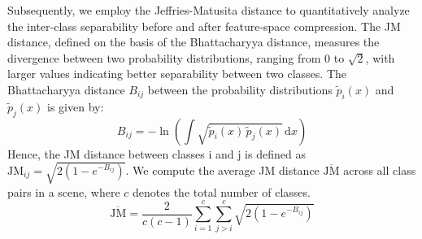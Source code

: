 \documentclass[runningheads]{llncs}
\begin{document}
Subsequently, we employ the Jeffries-Matusita distance to quantitatively analyze the inter‑class separability before and after feature‑space compression. The JM distance, defined on the basis of the Bhattacharyya distance, measures the divergence between two probability distributions, ranging from 0 to $\sqrt{2}$, with larger values indicating better separability between two classes. The Bhattacharyya distance $B_{ij}$ between the probability distributions $\tilde{p}_i(x)$ and $\tilde{p}_j(x)$ is given by:
\begin{equation}
    B_{ij} = -\ln \left( \int \sqrt{\tilde{p}_i(x) \, \tilde{p}_j(x)} \, \mathrm{d}x \right)
\end{equation}
Hence, the JM distance between classes i and j is defined as $\text{JM}_{ij} = \sqrt{2(1 - e^{-B_{ij}})}$. We compute the average JM distance $\overline{\text{JM}}$ across all class pairs in a scene, where $c$ denotes the total number of classes.
\begin{equation}
    \overline{\text{JM}} = \frac{2}{c(c-1)} \sum_{i=1}^{c} \sum_{j>i}^{c} \sqrt{2(1 - e^{-B_{ij}})}
\end{equation}
\end{document}

